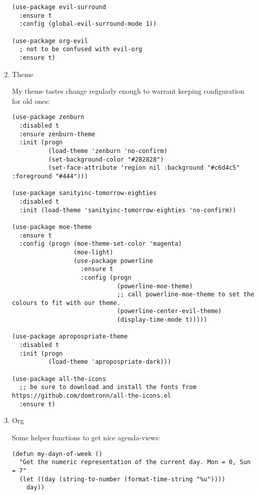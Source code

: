 \documentclass[11pt]{article}
\begin{document}
\begin{enumerate}
\begin{verbatim}
(use-package evil-surround
  :ensure t
  :config (global-evil-surround-mode 1))

(use-package org-evil
  ; not to be confused with evil-org
  :ensure t)
\end{verbatim}

\item Theme
\label{sec-1-2-2-6}

My theme tastes change regularly enough to warrant keeping configuration for old ones:

\begin{verbatim}
(use-package zenburn
  :disabled t
  :ensure zenburn-theme
  :init (progn
          (load-theme 'zenburn 'no-confirm)
          (set-background-color "#282828")
          (set-face-attribute 'region nil :background "#c6d4c5" :foreground "#444")))

(use-package sanityinc-tomorrow-eighties
  :disabled t
  :init (load-theme 'sanityinc-tomorrow-eighties 'no-confirm))

(use-package moe-theme
  :ensure t
  :config (progn (moe-theme-set-color 'magenta)
                 (moe-light)
                 (use-package powerline
                   :ensure t
                   :config (progn
                             (powerline-moe-theme)
                             ;; call powerline-moe-theme to set the colours to fit with our theme.
                             (powerline-center-evil-theme)
                             (display-time-mode t)))))

(use-package apropospriate-theme
  :disabled t
  :init (progn
          (load-theme 'apropospriate-dark)))

(use-package all-the-icons
  ;; be sure to download and install the fonts from https://github.com/domtronn/all-the-icons.el
  :ensure t)
\end{verbatim}

\item Org
\label{sec-1-2-2-7}

Some helper functions to get nice agenda-views:

\begin{verbatim}
(defun my-dayn-of-week ()
  "Get the numeric representation of the current day. Mon = 0, Sun = 7"
  (let ((day (string-to-number (format-time-string "%u"))))
    day))


\end{verbatim}
\end{enumerate}
\end{document}
